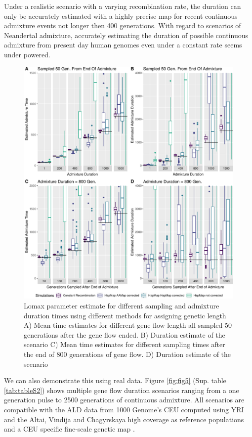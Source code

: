 \documentclass[]{article}
\begin{document}
Under a realistic scenario with a varying recombination
rate, the duration can only be accurately estimated with a highly
precise map for recent continuous admixture events not longer then 400
generations. With regard to scenarios of Neandertal admixture,
accurately estimating the duration of possible continuous admixture from
present day human genomes even under a constant rate seems
under powered. 


\begin{figure}
\centering
\includegraphics{Admixture_Time_Inference_Paper_Draft_files/figure-latex/fig4-1.pdf}
\caption{\label{fig:fig4} Lomax parameter estimate for different sampling and
admixture duration times using different methods for assigning genetic
length A) Mean time estimates for different gene
flow length all sampled 50 generations after the gene flow ended. B)
Duration estimate of the scenario C) Mean time estimates for different sampling times after the end of 800
generations of gene flow. D) Duration estimate of the scenario}
\end{figure}


We can also demonstrate this using real data.
Figure \ref{fig:fig5} (Sup. table \ref{tab:tableS2}) shows multiple gene flow duration scenarios ranging from a one generation pulse to 2500 generations of continuous admixture. All scenarios are compatible with the ALD data from 1000 Genome's CEU computed using YRI and the Altai, Vindija and Chagyrskaya high coverage as reference populations and a CEU specific fine-scale genetic map \citep{spence_inference_2019}.
\end{document}
